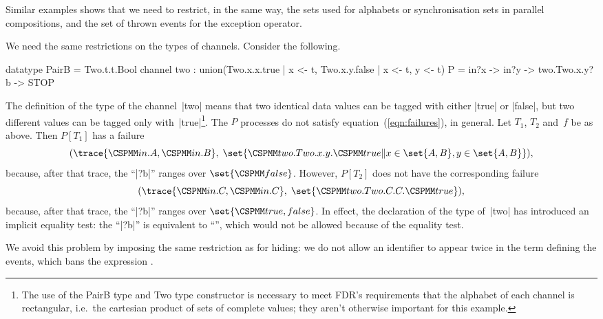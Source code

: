 Similar examples shows that we need to restrict, in the same way, the sets
used for alphabets or synchronisation sets in parallel compositions, and the
set of thrown events for the exception operator.

We need the same restrictions on the types of channels.  Consider the
following.
\begin{cspm}
datatype PairB = Two.t.t.Bool
channel two : union({Two.x.x.true | x <- t}, {Two.x.y.false | x <- t, y <- t})
P = in?x -> in?y -> two.Two.x.y?b -> STOP
\end{cspm}
%
The definition of the type of the channel~|two| means that two identical data
values can be tagged with either |true| or |false|, but two different values
can be tagged only with~|true|\footnote{The use of the {\cspmfont PairB} type
and {\cspmfont Two} type constructor is necessary to meet FDR's requirements
that the alphabet of each channel is rectangular, i.e.~the cartesian product
of sets of complete values; they aren't otherwise important for this
example.}.  The $P$ processes do not satisfy equation~(\ref{eqn:failures}), in
general.  Let $T_1$, $T_2$ and~$f$ be as above.  Then $P[T_1]$ has a failure
\[
(\trace{\M{in}.A, \M{in}.B},\; 
  \set{\M{two.Two}.x.y.\M{true} \| x \in \set{A,B}, y \in \set{A,B}}),
\]
because, after that trace, the ``|?b|'' ranges over $\set{\M{false}}$.  
However,  $P[T_2]$ does not have the corresponding failure
\[
(\trace{\M{in}.C, \M{in}.C},\; \set{\M{two.Two}.C.C.\M{true}}),
\]
because, after that trace, the ``|?b|'' ranges over $\set{\M{true,false}}$.
In effect, the declaration of the type of~|two| has introduced an implicit
equality test: the ``|?b|'' is equivalent to ``'', which would not be allowed because of
the equality test.

We avoid this problem by imposing the same restriction as for hiding: we do
not allow an identifier to appear twice in the term defining the events, which
bans the expression .





